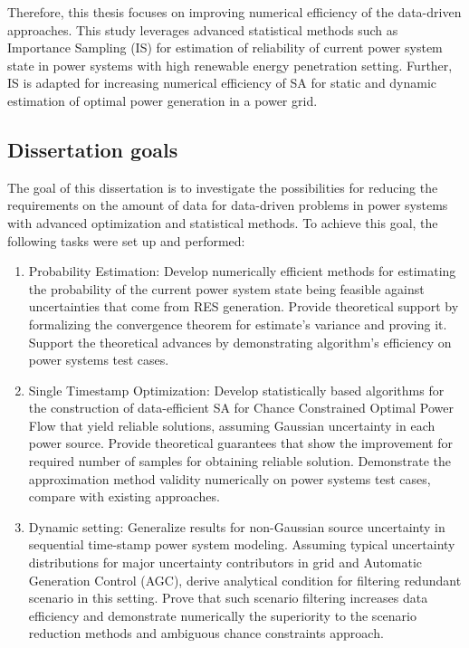 Therefore, this thesis focuses on improving numerical efficiency of the data-driven approaches. This study leverages advanced statistical methods such as Importance Sampling (IS) for estimation of reliability of current power system state in power systems with high renewable energy penetration setting. Further, IS is adapted for increasing numerical efficiency of SA for static and dynamic estimation of optimal power generation in a power grid.



\subsection*{Dissertation goals} 

The goal of this dissertation is to investigate the possibilities for reducing the requirements on the amount of data for data-driven problems in power systems with advanced optimization and statistical methods. To achieve this goal, the following tasks were set up and performed:

\begin{enumerate}
    \item Probability Estimation: Develop numerically efficient methods for estimating the probability of the current power system state being feasible against uncertainties that come from RES generation. Provide theoretical support by formalizing the convergence theorem for estimate's variance and proving it. Support the theoretical advances by demonstrating algorithm's efficiency on power systems test cases.
    \item Single Timestamp Optimization: Develop statistically based algorithms for the construction of data-efficient SA for Chance Constrained Optimal Power Flow that yield reliable solutions, assuming Gaussian uncertainty in each power source. Provide theoretical guarantees that show the improvement for required number of samples for obtaining reliable solution. Demonstrate the approximation method validity numerically on power systems test cases, compare with existing approaches.
    \item Dynamic setting: Generalize results for non-Gaussian source uncertainty in sequential time-stamp power system modeling. Assuming typical uncertainty distributions for major uncertainty contributors in grid and Automatic Generation Control (AGC), derive analytical condition for filtering redundant scenario in this setting. Prove that such scenario filtering increases data efficiency and demonstrate numerically the superiority to the scenario reduction methods and ambiguous chance constraints approach.
\end{enumerate}


